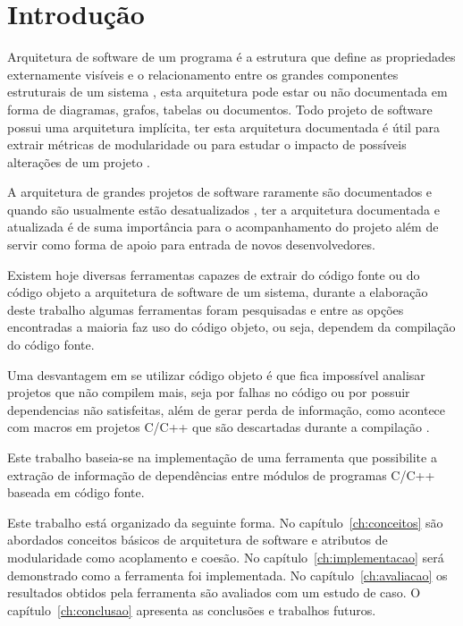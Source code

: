 \chapter{Introdução}

Arquitetura de software de um programa é a estrutura que define as propriedades
externamente visíveis e o relacionamento entre os grandes componentes
estruturais de um sistema \cite{engenhariaDeSoftwarePressman}, esta arquitetura
pode estar ou não documentada em forma de diagramas, grafos, tabelas ou
documentos. Todo projeto de software possui uma arquitetura implícita, ter
esta arquitetura documentada é útil para extrair métricas de modularidade ou
para estudar o impacto de possíveis alterações de um projeto
\cite{mata26-terceiro-projeto-piloto}.

A arquitetura de grandes projetos de software raramente são documentados e
quando são usualmente estão desatualizados
\cite{sourceVersusObjectCodeExtraction}, ter a arquitetura documentada e
atualizada é de suma importância para o acompanhamento do projeto além de
servir como forma de apoio para entrada de novos desenvolvedores.

Existem hoje diversas ferramentas capazes de extrair do código fonte ou do
código objeto a arquitetura de software de um sistema, durante a elaboração
deste trabalho algumas ferramentas foram pesquisadas
\cite{sourceVersusObjectCodeExtraction} e entre as opções encontradas a maioria
faz uso do código objeto, ou seja, dependem da compilação do código fonte.

Uma desvantagem em se utilizar código objeto é que fica impossível analisar
projetos que não compilem mais, seja por falhas no código ou por possuir
dependencias não satisfeitas, além de gerar perda de informação, como acontece
com macros em projetos C/C++ que são descartadas durante a compilação
\cite{sourceVersusObjectCodeExtraction}.

Este trabalho baseia-se na implementação de uma ferramenta que possibilite a
extração de informação de dependências entre módulos de programas C/C++ baseada
em código fonte.

Este trabalho está organizado da seguinte forma. No capítulo~\ref{ch:conceitos}
são abordados conceitos básicos de arquitetura de software e atributos de
modularidade como acoplamento e coesão. No capítulo~\ref{ch:implementacao} será
demonstrado como a ferramenta foi implementada. No capítulo~\ref{ch:avaliacao}
os resultados obtidos pela ferramenta são avaliados com um estudo de caso. O
capítulo~\ref{ch:conclusao} apresenta as conclusões e trabalhos futuros.

